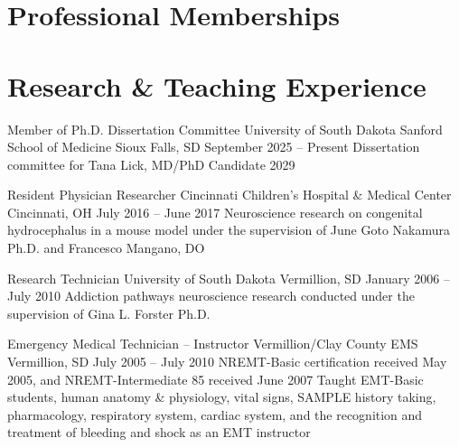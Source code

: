 \documentclass[11pt, a4paper, sans]{moderncv}
\begin{document}
\section{Professional Memberships}

\section{Research \& Teaching Experience}

\cventry%
  {Member of Ph.D. Dissertation Committee}%
  {University of South Dakota Sanford School of Medicine}%
  {Sioux Falls, SD}%
  {September 2025 -- Present}%
  {Dissertation committee for Tana Lick, MD/PhD Candidate 2029}


\cventry%
  {Resident Physician Researcher}%
  {Cincinnati Children's Hospital \& Medical Center}%
  {Cincinnati, OH}%
  {July 2016 -- June 2017}%
  {Neuroscience research on congenital hydrocephalus in a mouse model under the supervision of June Goto Nakamura Ph.D. and Francesco Mangano, DO}

\cventry%
  {Research Technician}%
  {University of South Dakota}%
  {Vermillion, SD}%
  {January 2006 -- July 2010}%
  {Addiction pathways neuroscience research conducted under the supervision of Gina L. Forster Ph.D.}

\cventry%
  {Emergency Medical Technician -- Instructor}%
  {Vermillion/Clay County EMS}%
  {Vermillion, SD}%
  {July 2005 -- July 2010}%
  {NREMT-Basic certification received May 2005, and NREMT-Intermediate 85 received June 2007 \textbullet{} Taught EMT-Basic students, human anatomy \& physiology, vital signs, SAMPLE history taking, pharmacology, respiratory system, cardiac system, and the recognition and treatment of bleeding and shock as an EMT instructor}
\end{document}
